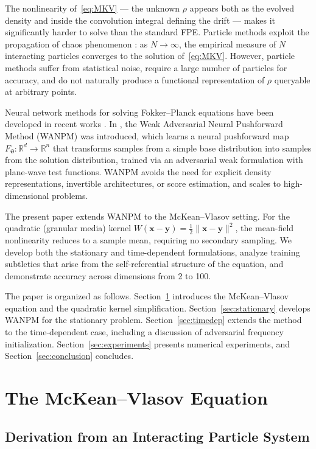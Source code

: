 \documentclass[12pt]{article}
\newcommand{\bx}{\mathbf{x}}
\newcommand{\by}{\mathbf{y}}
\newcommand{\vth}{\boldsymbol{\vartheta}}
\newcommand{\Rn}{\mathbb{R}^n}
\newcommand{\Rd}{\mathbb{R}^d}
\theoremstyle{plain}
\begin{document}
The nonlinearity of~\eqref{eq:MKV} --- the unknown $\rho$ appears both as the evolved
density and inside the convolution integral defining the drift --- makes it significantly
harder to solve than the standard FPE. Particle methods exploit the propagation of chaos
phenomenon \cite{Sznitman1991}: as $N\to\infty$, the empirical measure of $N$
interacting particles converges to the solution of~\eqref{eq:MKV}. However, particle
methods suffer from statistical noise, require a large number of particles for accuracy,
and do not naturally produce a functional representation of $\rho$ queryable at arbitrary
points.

Neural network methods for solving Fokker--Planck equations have been developed in
recent works \cite{XuFP2020,LiuNPFP2022,EHanLi2019,ZhaiDobsonLi2022}. In
\cite{HeCai2025}, the Weak Adversarial Neural Pushforward Method (WANPM) was
introduced, which learns a neural pushforward map $F_{\vth}:\Rd\to\Rn$ that transforms
samples from a simple base distribution into samples from the solution distribution,
trained via an adversarial weak formulation with plane-wave test functions. WANPM avoids
the need for explicit density representations, invertible architectures, or score
estimation, and scales to high-dimensional problems.

The present paper extends WANPM to the McKean--Vlasov setting. For the quadratic
(granular media) kernel $W(\bx-\by)=\frac{1}{2}\|\bx-\by\|^2$, the mean-field
nonlinearity reduces to a sample mean, requiring no secondary sampling. We develop both
the stationary and time-dependent formulations, analyze training subtleties that arise
from the self-referential structure of the equation, and demonstrate accuracy across
dimensions from 2 to 100.

The paper is organized as follows. Section~\ref{sec:eq} introduces the McKean--Vlasov
equation and the quadratic kernel simplification. Section~\ref{sec:stationary} develops
WANPM for the stationary problem. Section~\ref{sec:timedep} extends the method to the
time-dependent case, including a discussion of adversarial frequency initialization.
Section~\ref{sec:experiments} presents numerical experiments, and Section~\ref{sec:conclusion}
concludes.

\section{The McKean--Vlasov Equation}
\label{sec:eq}

\subsection{Derivation from an Interacting Particle System}
\end{document}
